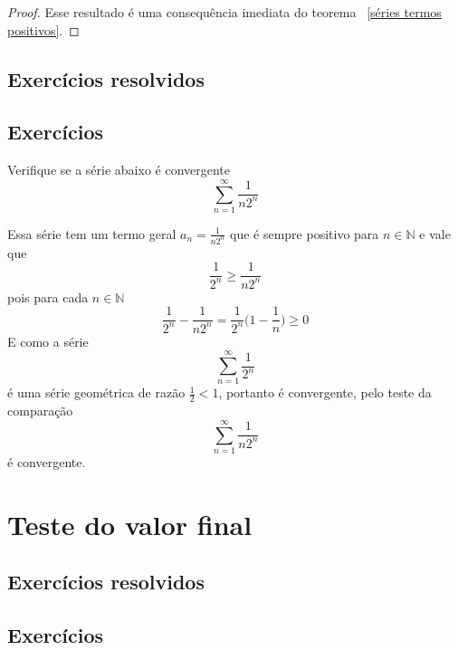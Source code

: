 \begin{proof}
    Esse resultado é uma consequência imediata do teorema ~\ref{séries termos positivos}.
\end{proof}

\subsection*{Exercícios resolvidos}

\construirExeresol


\subsection*{Exercícios}

\construirExer

\begin{exer}
    Verifique se a série abaixo é convergente 
    $$\sum_{n =1}^{\infty} \frac{1}{n2^n}$$
\end{exer}

\begin{resp}
    Essa série tem um termo geral $a_n = \frac{1}{n2^n}$ que é sempre positivo
    para $n \in \mathbb{N}$ e vale que 
    $$\frac{1}{2^n} \geq \frac{1}{n2^n} $$
    pois para cada $n \in \mathbb{N}$
    $$\frac{1}{2^n} - \frac{1}{n2^n} = \frac{1}{2^n}\bigg(1 - \frac{1}{n}\bigg) \geq 0$$
    E como a série  $$\sum_{n =1}^{\infty} \frac{1}{2^n}$$ é uma série geométrica
    de razão $\frac{1}{2} < 1$, portanto é convergente, pelo teste da comparação 
    $$\sum_{n =1}^{\infty} \frac{1}{n2^n}$$
    é convergente.
\end{resp}

\section{Teste do valor final}
\construirSec

\subsection*{Exercícios resolvidos}

\construirExeresol


\subsection*{Exercícios}

\construirExer


